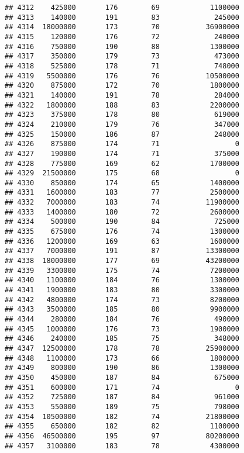 \documentclass[
]{article}
\begin{document}
\begin{verbatim}
## 4312    425000       176        69            1100000
## 4313    140000       191        83             245000
## 4314  18000000       173        70           36900000
## 4315    120000       176        72             240000
## 4316    750000       190        88            1300000
## 4317    350000       179        73             473000
## 4318    525000       178        71             748000
## 4319   5500000       176        76           10500000
## 4320    875000       172        70            1800000
## 4321    140000       191        78             284000
## 4322   1800000       188        83            2200000
## 4323    375000       178        80             619000
## 4324    210000       179        76             347000
## 4325    150000       186        87             248000
## 4326    875000       174        71                  0
## 4327    190000       174        71             375000
## 4328    775000       169        62            1700000
## 4329  21500000       175        68                  0
## 4330    850000       174        65            1400000
## 4331   1600000       183        77            2500000
## 4332   7000000       183        74           11900000
## 4333   1400000       180        72            2600000
## 4334    500000       190        84             725000
## 4335    675000       176        74            1300000
## 4336   1200000       169        63            1600000
## 4337   7000000       191        87           13300000
## 4338  18000000       177        69           43200000
## 4339   3300000       175        74            7200000
## 4340   1100000       184        76            1300000
## 4341   1900000       183        80            3300000
## 4342   4800000       174        73            8200000
## 4343   3500000       185        80            9900000
## 4344    280000       184        76             490000
## 4345   1000000       176        73            1900000
## 4346    240000       185        75             348000
## 4347  12500000       178        78           25900000
## 4348   1100000       173        66            1800000
## 4349    800000       190        86            1300000
## 4350    450000       187        84             675000
## 4351    600000       171        74                  0
## 4352    725000       187        84             961000
## 4353    550000       189        75             798000
## 4354  10500000       182        74           21800000
## 4355    650000       182        82            1100000
## 4356  46500000       195        97           80200000
## 4357   3100000       183        78            4300000

\end{verbatim}
\end{document}
